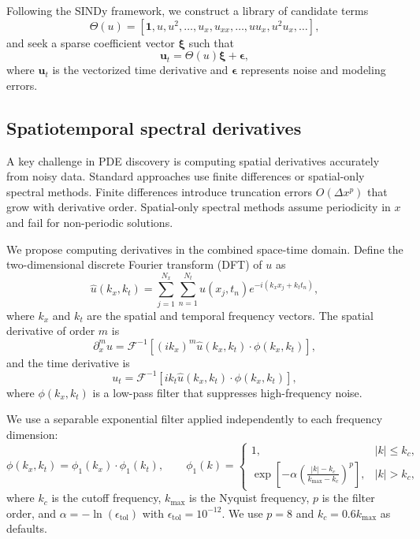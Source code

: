 \documentclass[preprint,12pt]{elsarticle}
\begin{document}
Following the SINDy framework, we construct a library of candidate terms
\begin{equation}
\Theta(u) = [\mathbf{1}, u, u^2, \ldots, u_x, u_{xx}, \ldots, u u_x, u^2 u_x, \ldots],
\end{equation}
and seek a sparse coefficient vector $\boldsymbol{\xi}$ such that
\begin{equation}
\mathbf{u}_t = \Theta(u) \boldsymbol{\xi} + \boldsymbol{\epsilon},
\end{equation}
where $\mathbf{u}_t$ is the vectorized time derivative and $\boldsymbol{\epsilon}$ represents noise and modeling errors.

\subsection{Spatiotemporal spectral derivatives}
\label{sec:spacetime}

A key challenge in PDE discovery is computing spatial derivatives accurately from noisy data. Standard approaches use finite differences or spatial-only spectral methods. Finite differences introduce truncation errors $O(\Delta x^p)$ that grow with derivative order. Spatial-only spectral methods assume periodicity in $x$ and fail for non-periodic solutions.

We propose computing derivatives in the combined space-time domain. Define the two-dimensional discrete Fourier transform (DFT) of $u$ as
\begin{equation}
\hat{u}(k_x, k_t) = \sum_{j=1}^{N_x} \sum_{n=1}^{N_t} u(x_j, t_n) e^{-i(k_x x_j + k_t t_n)},
\end{equation}
where $k_x$ and $k_t$ are the spatial and temporal frequency vectors. The spatial derivative of order $m$ is
\begin{equation}
\partial_x^m u = \mathcal{F}^{-1}\left[(i k_x)^m \hat{u}(k_x, k_t) \cdot \phi(k_x, k_t)\right],
\end{equation}
and the time derivative is
\begin{equation}
u_t = \mathcal{F}^{-1}\left[i k_t \hat{u}(k_x, k_t) \cdot \phi(k_x, k_t)\right],
\end{equation}
where $\phi(k_x, k_t)$ is a low-pass filter that suppresses high-frequency noise.

We use a separable exponential filter applied independently to each frequency dimension:
\begin{equation}
\phi(k_x, k_t) = \phi_1(k_x) \cdot \phi_1(k_t), \qquad
\phi_1(k) = \begin{cases}
1, & |k| \le k_c, \\
\exp\!\left[-\alpha \left(\frac{|k|-k_c}{k_{\max}-k_c}\right)^p\right], & |k| > k_c,
\end{cases}
\end{equation}
where $k_c$ is the cutoff frequency, $k_{\max}$ is the Nyquist frequency, $p$ is the filter order, and $\alpha = -\ln(\epsilon_{\text{tol}})$ with $\epsilon_{\text{tol}} = 10^{-12}$. We use $p = 8$ and $k_c = 0.6 k_{\max}$ as defaults.
\end{document}
